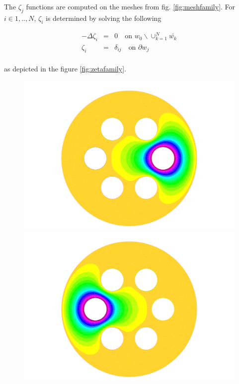 The $\zeta_j$ functions are computed on the meshes from fig.
\ref{fig:meshfamily}. For $i \in {1,..,N}$, $\zeta_i$ is determined by solving
the following 

\begin{equation}
  \label{eq:zetapde}
  \begin{array}{rcl}
    -\Delta \zeta_i &=& 0 \quad \text{on }  w_0 \backslash \cup_{k=1}^N \bar{w_k}\\
    \zeta_i &=& \delta_{ij} \quad \text{on } \partial w_j \\ 
  \end{array}  
\end{equation}

as depicted in the figure \ref{fig:zetafamily}.

\begin{figure}[!h]
  \centering
  \includegraphics[scale=0.20]{figures/sol_0.pdf}
  \includegraphics[scale=0.20]{figures/sol_3.pdf}

\end{figure}
